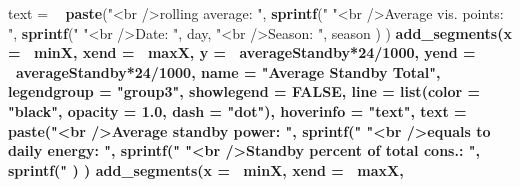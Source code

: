 \documentclass[
  a4paperpaper,
]{book}
\newenvironment{Shaded}{\begin{snugshade}}{\end{snugshade}}
\newcommand{\DataTypeTok}[1]{\textcolor[rgb]{0.13,0.29,0.53}{#1}}
\newcommand{\DecValTok}[1]{\textcolor[rgb]{0.00,0.00,0.81}{#1}}
\newcommand{\FloatTok}[1]{\textcolor[rgb]{0.00,0.00,0.81}{#1}}
\newcommand{\KeywordTok}[1]{\textcolor[rgb]{0.13,0.29,0.53}{\textbf{#1}}}
\newcommand{\NormalTok}[1]{#1}
\newcommand{\OperatorTok}[1]{\textcolor[rgb]{0.81,0.36,0.00}{\textbf{#1}}}
\newcommand{\OtherTok}[1]{\textcolor[rgb]{0.56,0.35,0.01}{#1}}
\newcommand{\StringTok}[1]{\textcolor[rgb]{0.31,0.60,0.02}{#1}}
\let\oldShaded\Shaded
\let\endoldShaded\endShaded
\renewenvironment{Shaded}{\footnotesize\oldShaded}{\endoldShaded}
\begin{document}
\begin{Shaded}
\begin{Highlighting}[]
{{{{{{{{{{{{{{{{{{{{{{{{{{{{{{{{{{{{{{{{{{{{               \DataTypeTok{text =} \OperatorTok{~}\StringTok{ }\KeywordTok{paste}\NormalTok{(}\StringTok{"<br />rolling average:        "}\NormalTok{, }\KeywordTok{sprintf}\NormalTok{(}\StringTok{"%
                              \StringTok{"<br />Average vis. points: "}\NormalTok{, }\KeywordTok{sprintf}\NormalTok{(}\StringTok{"%
                              \StringTok{"<br />Date:                        "}\NormalTok{, day,}
                              \StringTok{"<br />Season:                   "}\NormalTok{, season}
\NormalTok{               )}
\NormalTok{  ) }\OperatorTok{%
\StringTok{  }\KeywordTok{add_segments}\NormalTok{(}\DataTypeTok{x =} \OperatorTok{~}\NormalTok{minX,}
               \DataTypeTok{xend =} \OperatorTok{~}\NormalTok{maxX,}
               \DataTypeTok{y =} \OperatorTok{~}\NormalTok{averageStandby}\OperatorTok{*}\DecValTok{24}\OperatorTok{/}\DecValTok{1000}\NormalTok{,}
               \DataTypeTok{yend =} \OperatorTok{~}\NormalTok{averageStandby}\OperatorTok{*}\DecValTok{24}\OperatorTok{/}\DecValTok{1000}\NormalTok{,}
               \DataTypeTok{name =} \StringTok{"Average Standby Total"}\NormalTok{,}
               \DataTypeTok{legendgroup =} \StringTok{"group3"}\NormalTok{,}
               \DataTypeTok{showlegend =} \OtherTok{FALSE}\NormalTok{,}
               \DataTypeTok{line =} \KeywordTok{list}\NormalTok{(}\DataTypeTok{color =} \StringTok{"black"}\NormalTok{, }\DataTypeTok{opacity =} \FloatTok{1.0}\NormalTok{, }\DataTypeTok{dash =} \StringTok{"dot"}\NormalTok{),}
               \DataTypeTok{hoverinfo =} \StringTok{"text"}\NormalTok{,}
               \DataTypeTok{text =} \OperatorTok{~}\StringTok{ }\KeywordTok{paste}\NormalTok{(}\StringTok{"<br />Average standby power:          "}\NormalTok{, }\KeywordTok{sprintf}\NormalTok{(}\StringTok{"%
                              \StringTok{"<br />equals to daily energy:         "}\NormalTok{, }\KeywordTok{sprintf}\NormalTok{(}\StringTok{"%
                              \StringTok{"<br />Standby percent of total cons.: "}\NormalTok{, }\KeywordTok{sprintf}\NormalTok{(}\StringTok{"%
\NormalTok{               )}
\NormalTok{  ) }\OperatorTok{%
\StringTok{  }\KeywordTok{add_segments}\NormalTok{(}\DataTypeTok{x =} \OperatorTok{~}\NormalTok{minX,}
               \DataTypeTok{xend =} \OperatorTok{~}\NormalTok{maxX,}
}}}}}}}}}}}}}}}}}}}}}}}}}}}}}}}}}}}}}}}}}}}}}}}}}}}
\end{Highlighting}
\end{Shaded}
\end{document}
